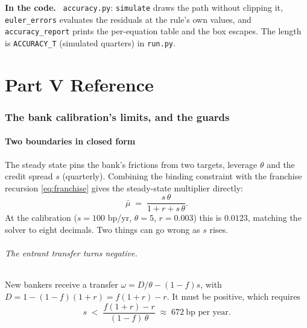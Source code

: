 \documentclass[10pt,a4paper]{article}
\newenvironment{incode}{\begin{leftbar}\small\noindent\textcolor{codecol}{\textbf{In the code.}}\ }{\end{leftbar}}
\theoremstyle{plain}
\theoremstyle{remark}
\newcommand{\file}[1]{\textcolor{codecol}{\texttt{#1}}}
\newcommand{\code}[1]{\texttt{#1}}
\begin{document}
\begin{incode}
\file{accuracy.py}: \code{simulate} draws the path without clipping it, \code{euler\_errors}
evaluates the residuals at the rule's own values, and \code{accuracy\_report} prints the per-equation
table and the box escapes. The length is \code{ACCURACY\_T} (simulated quarters) in \file{run.py}.
\end{incode}

\part*{Part V \quad Reference}
\section{The bank calibration's limits, and the guards}
\label{sec:reference}

\subsection{Two boundaries in closed form}

The steady state pins the bank's frictions from two targets, leverage $\theta$ and the credit spread
$s$ (quarterly). Combining the binding constraint with the franchise recursion \eqref{eq:franchise}
gives the steady-state multiplier directly:
\begin{equation}
  \bar\mu \;=\; \frac{s\,\theta}{1+r+s\,\theta}.
  \label{eq:muss}
\end{equation}
At the calibration ($s = 100$ bp/yr, $\theta=5$, $r=0.003$) this is $0.0123$, matching the solver to
eight decimals. Two things can go wrong as $s$ rises.

\paragraph{The entrant transfer turns negative.} New bankers receive a transfer
$\omega = D/\theta - (1-f)s$, with $D = 1-(1-f)(1+r) = f(1+r) - r$. It must be positive, which requires
\begin{equation}
  s \;<\; \frac{f(1+r)-r}{(1-f)\,\theta} \;\approx\; 672\ \text{bp per year}.
\end{equation}
\end{document}
